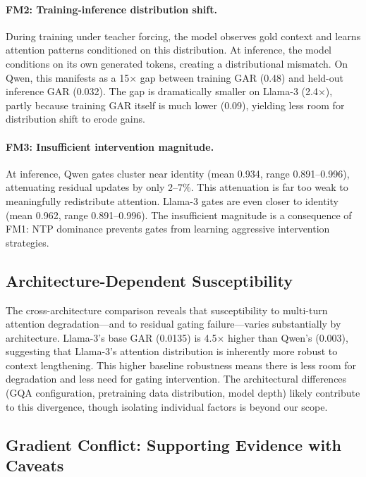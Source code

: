 \documentclass[11pt,a4paper]{article}
\begin{document}
\paragraph{FM2: Training-inference distribution shift.}
During training under teacher forcing, the model observes gold context and learns attention patterns conditioned on this distribution. At inference, the model conditions on its own generated tokens, creating a distributional mismatch. On Qwen, this manifests as a 15$\times$ gap between training GAR (0.48) and held-out inference GAR (0.032). The gap is dramatically smaller on Llama-3 (2.4$\times$), partly because training GAR itself is much lower (0.09), yielding less room for distribution shift to erode gains.

\paragraph{FM3: Insufficient intervention magnitude.}
At inference, Qwen gates cluster near identity (mean 0.934, range 0.891--0.996), attenuating residual updates by only 2--7\%. This attenuation is far too weak to meaningfully redistribute attention. Llama-3 gates are even closer to identity (mean 0.962, range 0.891--0.996). The insufficient magnitude is a consequence of FM1: NTP dominance prevents gates from learning aggressive intervention strategies.

\subsection{Architecture-Dependent Susceptibility}

The cross-architecture comparison reveals that susceptibility to multi-turn attention degradation---and to residual gating failure---varies substantially by architecture. Llama-3's base GAR (0.0135) is 4.5$\times$ higher than Qwen's (0.003), suggesting that Llama-3's attention distribution is inherently more robust to context lengthening. This higher baseline robustness means there is less room for degradation and less need for gating intervention. The architectural differences (GQA configuration, pretraining data distribution, model depth) likely contribute to this divergence, though isolating individual factors is beyond our scope.

\subsection{Gradient Conflict: Supporting Evidence with Caveats}
\end{document}
